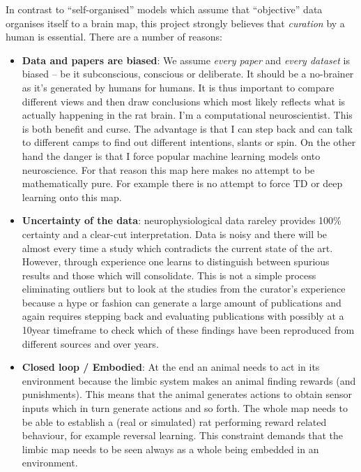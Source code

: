 \documentclass[12pt,a4paper]{article}
\begin{document}
In contrast to ``self-organised'' models which assume that
``objective'' data organises itself to a brain map, this project
strongly believes that \textsl{curation} by a human is
essential. There are a number of reasons:
\begin{itemize}
\item \textbf{Data and papers are biased}: We assume \textsl{every
  paper} and \textsl{every dataset} is biased -- be it subconscious,
  conscious or deliberate. It should be a no-brainer as it's generated
  by humans for humans. It is thus important to compare different
  views and then draw conclusions which most likely reflects what is
  actually happening in the rat brain. I'm a computational
  neuroscientist. This is both benefit and curse.  The advantage is
  that I can step back and can talk to different camps to find out
  different intentions, slants or spin. On the other hand the danger
  is that I force popular machine learning models onto
  neuroscience. For that reason this map here makes no attempt to be
  mathematically pure. For example there is no attempt to force TD
  or deep learning onto this map.
\item \textbf{Uncertainty of the data}: neurophysiological data
  rareley provides 100\% certainty and a clear-cut
  interpretation. Data is noisy and there will be almost every time a
  study which contradicts the current state of the art. However,
  through experience one learns to distinguish between spurious
  results and those which will consolidate. This is not a simple
  process eliminating outliers but to look at the studies from the
  curator's experience because a hype or fashion can generate a large
  amount of publications and again requires stepping back and
  evaluating publications with possibly at a 10year timeframe to check
  which of these findings have been reproduced from different sources
  and over years.
\item \textbf{Closed loop / Embodied}: At the end an animal needs to
  act in its environment because the limbic system makes an animal
  finding rewards (and punishments). This means that the animal
  generates actions to obtain sensor inputs which in turn generate
  actions and so forth. The whole map needs to be able to establish a
  (real or simulated) rat performing reward related behaviour, for
  example reversal learning. This constraint demands that the limbic map
  needs to be seen always as a whole being embedded in an
  environment.
\end{itemize}
\end{document}
